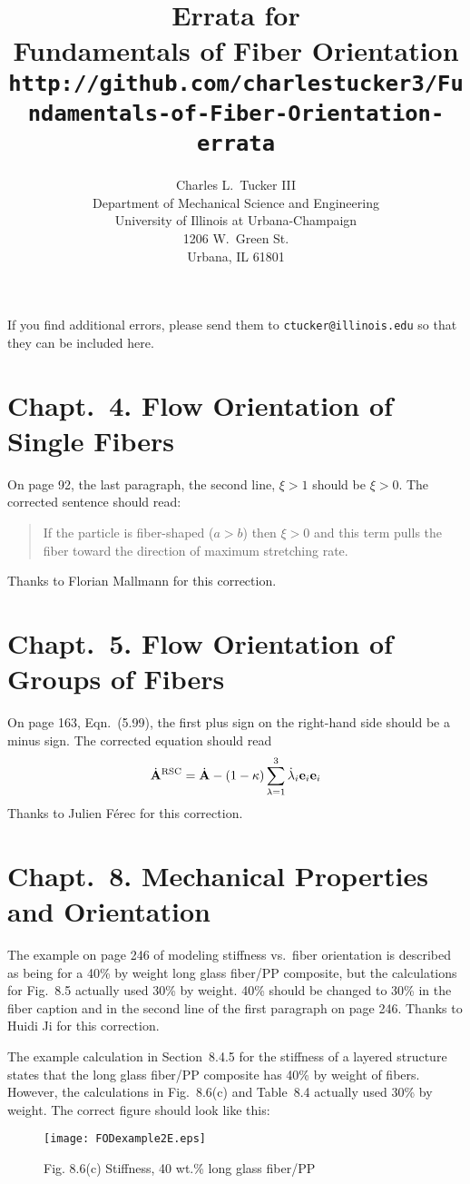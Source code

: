 \documentclass[11pt]{article}
\title{Errata for \\
      \textbf{Fundamentals of Fiber Orientation} \\
      { \normalsize \texttt{http://github.com/charlestucker3/Fundamentals-of-Fiber-Orientation-errata}} }
\author{Charles L.~Tucker III \\
       Department of Mechanical Science and Engineering \\
        University of Illinois at Urbana-Champaign \\
        1206 W.~Green St. \\
        Urbana, IL 61801 \\
        }
\begin{document}
\maketitle

If you find additional errors, please send them to \texttt{ctucker@illinois.edu} so that they can be included here.

\section*{Chapt.\ 4. Flow Orientation of Single Fibers}

On page 92, the last paragraph, the second line, $\xi > 1$ should be $\xi > 0$.  The corrected sentence should read:
\begin{quote}
If the particle is fiber-shaped ($a > b$) then $\xi > 0$ and this term pulls the fiber toward the direction of maximum stretching rate.
\end{quote}
Thanks to Florian Mallmann for this correction.

\section*{Chapt.\ 5. Flow Orientation of Groups of Fibers}

On page 163, Eqn.~(5.99), the first plus sign on the right-hand side should be a minus sign.  The corrected equation should read
\begin{equation*}
    \dot{\mathbf{A}}^\text{RSC} = \dot{\mathbf{A}} - (1 - \kappa) \sum_{\lambda = 1}^3 \dot{\lambda}_i \mathbf{e}_i \mathbf{e}_i
\end{equation*}
Thanks to Julien F\'erec for this correction.

\section*{Chapt.\ 8. Mechanical Properties and Orientation}

The example on page 246 of modeling stiffness vs.~fiber orientation is described as being for a 40\% by weight long glass fiber/PP composite, but the calculations for Fig.~8.5 actually used 30\% by weight.  40\% should be changed to 30\% in the fiber caption and in the second line of the first paragraph on page 246.  Thanks to Huidi Ji for this correction.

The example calculation in Section~8.4.5 for the stiffness of a layered structure states that the long glass fiber/PP composite has 40\% by weight of fibers.  However, the calculations in Fig.~8.6(c) and Table~8.4 actually used 30\% by weight.  The correct figure should look like this:
\begin{figure*}[h]
   \centering
    \texttt{[image: FODexample2E.eps]} \\
    \caption*{Fig. 8.6(c) Stiffness, 40 wt.\% long glass fiber/PP}
\end{figure*}
\end{document}
